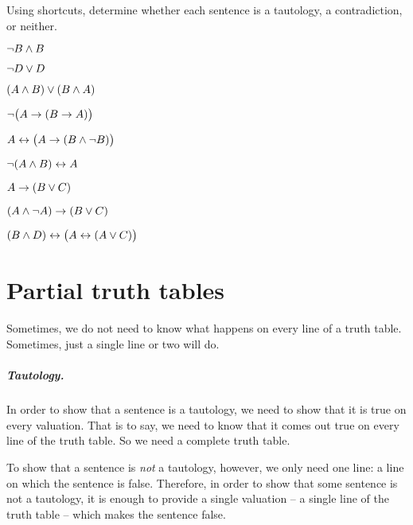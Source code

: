 

\practiceproblems
\problempart
\label{pr.TT.TTorCS}
Using shortcuts, determine whether each sentence is a tautology, a contradiction, or neither. 
\begin{earg}
\item $\neg B \wedge B$ %
\item $\neg D \vee D$ %
\item $(A\wedge B) \vee (B\wedge A)$ %
\item $\neg\bigl(A \rightarrow (B \rightarrow A) \bigr)$ %
\item $A \leftrightarrow \bigl(A \rightarrow (B \wedge \neg B) \bigr)$ %
\item $\neg(A\wedge B) \leftrightarrow A$ %
\item $A\rightarrow(B\vee C)$ %
\item $(A \wedge\neg A) \rightarrow (B \vee C)$ %
\item $(B\wedge D) \leftrightarrow \bigl(A \leftrightarrow(A \vee C) \bigr)$%
\end{earg}


\chapter{Partial truth tables}\label{s:PartialTruthTable}

Sometimes, we do not need to know what happens on every line of a truth table. Sometimes, just a single line or two will do. 

\paragraph{Tautology.} 
In order to show that a sentence is a tautology, we need to show that it is true on every valuation. That is to say, we need to know that it comes out true on every line of the truth table. So we need a complete truth table. 

To show that a sentence is \emph{not} a tautology, however, we only need one line: a line on which the sentence is false. Therefore, in order to show that some sentence is not a tautology, it is enough to provide a single valuation – a single line of the truth table – which makes the sentence false. 

